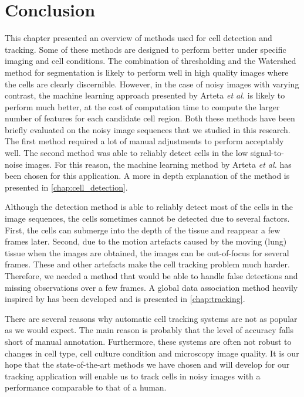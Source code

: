 \section{Conclusion \statusfirstdraft}
\label{sec:conclusionmethods}
This chapter presented an overview of methods used for cell detection and tracking. Some of these methods are designed to perform better under specific imaging and cell conditions. The combination of thresholding and the Watershed method for segmentation is likely to perform well in high quality images where the cells are clearly discernible. However, in the case of noisy images with varying contrast, the machine learning approach presented by Arteta \emph{et al.} is likely to perform much better, at the cost of computation time to compute the larger number of features for each candidate cell region. Both these methods have been briefly evaluated on the noisy image sequences that we studied in this research. The first method required a lot of manual adjustments to perform acceptably well. The second method was able to reliably detect cells in the low signal-to-noise images. For this reason, the machine learning method by Arteta \emph{et al.} has been chosen for this application. A more in depth explanation of the method is presented in \cref{chap:cell_detection}.

Although the detection method is able to reliably detect most of the cells in the image sequences, the cells sometimes cannot be detected due to several factors. First, the cells can submerge into the depth of the tissue and reappear a few frames later. Second, due to the motion artefacts caused by the moving (lung) tissue when the images are obtained, the images can be out-of-focus for several frames. These and other artefacts make the cell tracking problem much harder. Therefore, we needed a method that would be able to handle false detections and missing observations over a few frames. A global data association method heavily inspired by \cite{bise11global} has been developed and is presented in \cref{chap:tracking}.

There are several reasons why automatic cell tracking systems are not as popular as we would expect. The main reason is probably that the level of accuracy falls short of manual annotation. Furthermore, these systems are often not robust to changes in cell type, cell culture condition and microscopy image quality. It is our hope that the state-of-the-art methods we have chosen and will develop for our tracking application will enable us to track cells in noisy images with a performance comparable to that of a human.